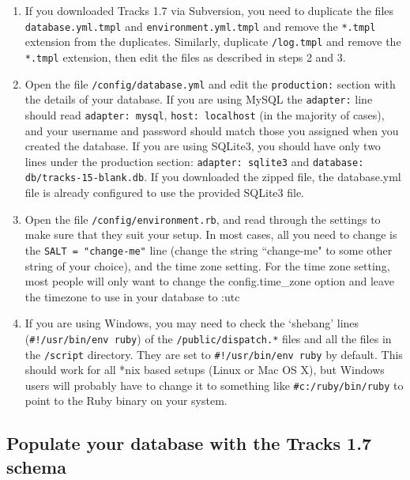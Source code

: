 \documentclass[10pt,twoside]{memoir}
\begin{document}
\begin{enumerate}


\item If you downloaded Tracks 1.7 via Subversion, you need to duplicate the files \texttt{database.yml.tmpl} and \texttt{environment.yml.tmpl} and remove the \texttt{*.tmpl} extension from the duplicates. Similarly, duplicate \texttt{/log.tmpl} and remove the \texttt{*.tmpl} extension, then edit the files as described in steps 2 and 3.

\item Open the file \texttt{/config/database.yml} and edit the \texttt{production:} section with the details of your database. If you are using MySQL the \texttt{adapter:} line should read \texttt{adapter: mysql}, \texttt{host: localhost} (in the majority of cases), and your username and password should match those you assigned when you created the database. If you are using SQLite3, you should have only two lines under the production section: \texttt{adapter: sqlite3} and \texttt{database: db/tracks-15-blank.db}. If you downloaded the zipped file, the database.yml file is already configured to use the provided SQLite3 file.

\item Open the file \texttt{/config/environment.rb}, and read through the settings to make sure that they suit your setup. In most cases, all you need to change is the \texttt{SALT = "change-me"} line (change the string ``change-me" to some other string of your choice), and the time zone setting. For the time zone setting, most people will only want to change the config.time\_zone option and leave the timezone to use in your database to :utc

\item If you are using Windows, you may need to check the `shebang' lines (\texttt{\#!/usr/bin/env ruby}) of the \texttt{/public/dispatch.*} files and all the files in the \texttt{/script} directory. They are set to \texttt{\#!/usr/bin/env ruby} by default. This should work for all *nix based setups (Linux or Mac OS X), but Windows users will probably have to change it to something like \texttt{\#c:/ruby/bin/ruby} to point to the Ruby binary on your system.
\end{enumerate}

\subsection{Populate your database with the Tracks 1.7 schema}
\label{rake_install}
\end{document}
